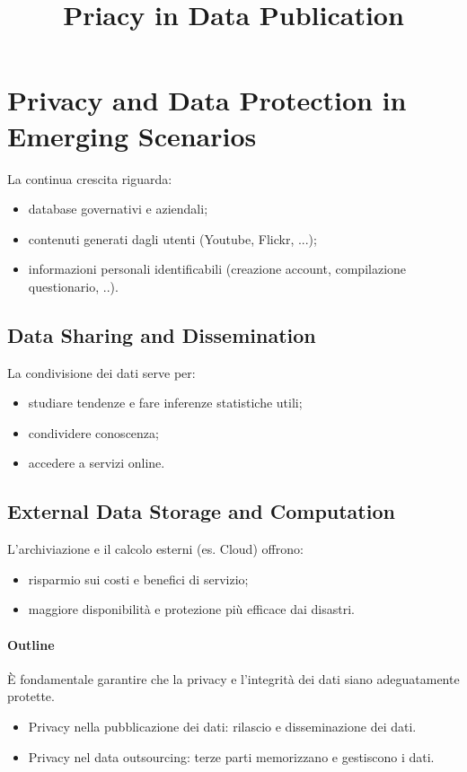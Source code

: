 \documentclass{report}
\title{Priacy in Data Publication}
\begin{document}
\maketitle





\section{Privacy and Data Protection in Emerging Scenarios}

La continua crescita riguarda:
\begin{itemize}
    \item database governativi e aziendali;
    \item contenuti generati dagli utenti (Youtube, Flickr, ...);
    \item informazioni personali identificabili (creazione account, compilazione questionario, ..).
\end{itemize}

\subsection{Data Sharing and Dissemination}
La condivisione dei dati serve per:
\begin{itemize}
    \item studiare tendenze e fare inferenze statistiche utili;
    \item condividere conoscenza;
    \item accedere a servizi online.
\end{itemize}

\subsection{External Data Storage and Computation}
L'archiviazione e il calcolo esterni (es. Cloud) offrono:
\begin{itemize}
    \item risparmio sui costi e benefici di servizio;
    \item maggiore disponibilità e protezione più efficace dai disastri.
\end{itemize}

\paragraph{Outline} 
È fondamentale garantire che la privacy e l'integrità dei dati siano adeguatamente protette.
\begin{itemize}
    \item Privacy nella pubblicazione dei dati: rilascio e disseminazione dei dati.
    \item Privacy nel data outsourcing: terze parti memorizzano e gestiscono i dati.
\end{itemize}
\end{document}
